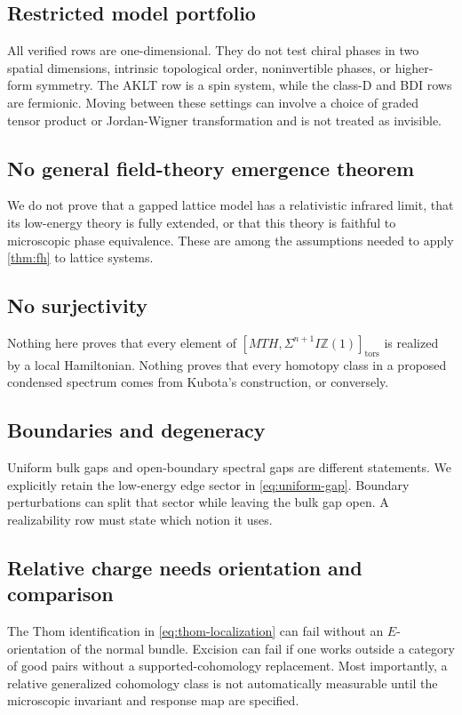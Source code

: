 \documentclass[12pt]{article}
\theoremstyle{definition}
\theoremstyle{remark}
\begin{document}
\subsection{Restricted model portfolio}

All verified rows are one-dimensional.  They do not test chiral phases in
two spatial dimensions, intrinsic topological order, noninvertible phases,
or higher-form symmetry.  The AKLT row is a spin system, while the class-D
and BDI rows are fermionic.  Moving between these settings can involve a
choice of graded tensor product or Jordan-Wigner transformation and is not
treated as invisible.

\subsection{No general field-theory emergence theorem}

We do not prove that a gapped lattice model has a relativistic infrared
limit, that its low-energy theory is fully extended, or that this theory is
faithful to microscopic phase equivalence.  These are among the assumptions
needed to apply \cref{thm:fh} to lattice systems.

\subsection{No surjectivity}

Nothing here proves that every element of
$[MTH,\Sigma^{n+1}I\mathbb Z(1)]_{\mathrm{tors}}$ is realized by a local
Hamiltonian.  Nothing proves that every homotopy class in a proposed
condensed spectrum comes from Kubota's construction, or conversely.

\subsection{Boundaries and degeneracy}

Uniform bulk gaps and open-boundary spectral gaps are different statements.
We explicitly retain the low-energy edge sector in \cref{eq:uniform-gap}.
Boundary perturbations can split that sector while leaving the bulk gap
open.  A realizability row must state which notion it uses.

\subsection{Relative charge needs orientation and comparison}

The Thom identification in \cref{eq:thom-localization} can fail without an
$E$-orientation of the normal bundle.  Excision can fail if one works
outside a category of good pairs without a supported-cohomology
replacement.  Most importantly, a relative generalized cohomology class is
not automatically measurable until the microscopic invariant and response
map are specified.
\end{document}
